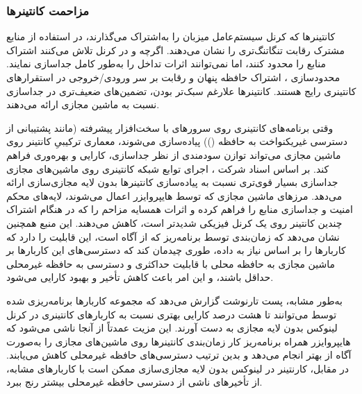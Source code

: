 \subsubsection{مزاحمت کانتینر‌ها}

کانتینرها که کرنل سیستم‌عامل میزبان را به‌اشتراک می‌گذارند، در استفاده از منابع مشترک رقابت تنگاتنگ‌تری را نشان می‌دهند. اگرچه  و  در کرنل تلاش می‌کنند اشتراک منابع را محدود کنند، اما نمی‌توانند اثرات تداخل را به‌طور کامل جداسازی نمایند. محدودسازی ، اشتراک حافظه پنهان و رقابت بر سر ورودی/خروجی در استقرارهای کانتینری  رایج هستند. کانتینرها علارغم سبک‌تر بودن، تضمین‌های ضعیف‌تری در جداسازی نسبت به ماشین مجازی ارائه می‌دهند.

وقتی برنامه‌های کانتینری روی سرورهای  با سخت‌افزار پیشرفته (مانند پشتیبانی از دسترسی غیریکنواخت به حافظه ()) پیاده‌سازی می‌شوند، معماری ترکیبیِ کانتینر روی ماشین مجازی می‌تواند توازن سودمندی از نظر جداسازی، کارایی و بهره‌وری  فراهم کند. بر اساس اسناد شرکت ، اجرای توابع شبکه کانتینری روی ماشین‌های مجازی جداسازی بسیار قوی‌تری نسبت به پیاده‌سازی کانتینرها بدون لایه مجازی‌سازی ارائه می‌دهد\cite{vmware_whitepaper}. مرزهای ماشین مجازی که توسط هایپروایزر اعمال می‌شوند، لایه‌های محکم امنیت و جداسازی منابع را فراهم کرده و اثرات همسایه مزاحم را که در هنگام اشتراک چندین کانتینر روی یک کرنل فیزیکی شدیدتر است، کاهش می‌دهند. این منبع همچنین نشان می‌دهد که زمان‌بندی  توسط برنامه‌ریز  که از   آگاه است، این قابلیت را دارد که کاربارها را بر اساس نیاز به داده، طوری چیدمان کند که دسترسی‌های این کاربارها بر ماشین‌ مجازی به حافظه محلی با قابلیت  حداکثری و دسترسی به حافظه غیرمحلی حداقل باشند، و این امر باعث کاهش تأخیر و بهبود کارایی می‌شود.

به‌طور مشابه، پست تارنوشت  گزارش می‌دهد\cite{vmware2019vSphere} که مجموعه کاربارها برنامه‌ریزی شده توسط  می‌توانند تا هشت درصد کارایی بهتری نسبت به کاربارهای کانتینری در کرنل لینوکس بدون لایه مجازی به دست آورند. این مزیت عمدتاً از آنجا ناشی می‌شود که هایپروایزر  همراه برنامه‌ریز  کار زمان‌بندی کانتینرها روی ماشین‌های مجازی را به‌صورت آگاه از  بهتر انجام می‌دهد و بدین ترتیب دسترسی‌های حافظه غیرمحلی کاهش می‌یابند. در مقابل، کارنتینر در لینوکس بدون لایه مجازی‌سازی ممکن است با کاربارهای مشابه، از تأخیرهای ناشی از دسترسی حافظه غیرمحلی بیشتر رنج ببرد.

